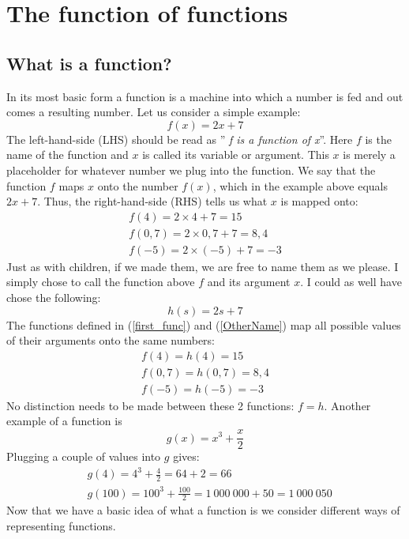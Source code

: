 \chapter{The function of functions}
\label{Chap_Func}

\section{What is a function?}
\label{Whatsafunction}
\noindent In its most basic form a function is a machine into which a number is fed and out comes a resulting number. Let us consider a simple example:
\begin{equation}
\label{first_func}
	f(x) = 2x + 7
\end{equation}
The left-hand-side (LHS) should be read as '' \textit{f is a function of x}''. Here $f$ is the name of the function and $x$ is called its variable or argument. This $x$ is merely a placeholder for whatever number we plug into the function. We say that the function $f$ maps $x$ onto the number $f(x)$,  which in the example above equals $2x+7$. Thus, the right-hand-side (RHS) tells us what $x$ is mapped onto:
\begin{eqnarray*}
	f(4) = 2 \times 4 + 7 = 15 \\
	f(0,7) = 2 \times 0,7 + 7= 8,4 \\
	f(-5) = 2 \times (-5) + 7 = -3
\end{eqnarray*}
\noindent Just as with children, if we made them, we are free to name them as we please. I simply chose to call the function above $f$ and its argument $x$. I could as well have chose the following:
\begin{equation}
\label{OtherName}
h(s) = 2s  + 7
\end{equation}
The functions defined in (\ref{first_func}) and (\ref{OtherName}) map all possible values of their arguments onto the same numbers: 
\begin{eqnarray*}
	f(4) = h(4) = 15 \\
	f(0,7) = h(0,7)= 8,4 \\
	f(-5) = h(-5) = -3
\end{eqnarray*}
\noindent No distinction needs to be made between these 2 functions: $ f = h$.
\noindent Another example of a function is
\begin{equation}
\label{FuncG}
g(x) = x^3 + \frac{x}{2}
\end{equation}
\noindent Plugging a couple of values into $g$ gives: 
\begin{eqnarray}
	& g(4) = 4^3 + \frac{4}{2} = 64 + 2 = 66 \nonumber\\
	& g(100)  =  100^3 + \frac{100}{2} = 1\: 000\: 000 + 50 = 1\:000\:050\nonumber
\end{eqnarray}
\noindent Now that we have a basic idea of what a function is we consider different ways of representing functions.

